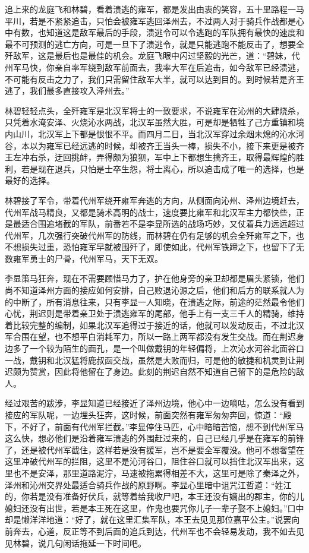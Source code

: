 追上来的龙庭飞和林碧，看着溃逃的雍军，都是发出由衷的笑容，五十里路程一马平川，若是不紧紧追击，只怕会被雍军逃回泽州去，不过两人对于骑兵作战都是心中有数，也知道这是敌军最后的手段，溃逃令可以令逃跑的军队拥有最快的速度和最不可预测的逃亡方向，可是一旦下了溃逃令，就是只能逃跑不能反击了，想要全歼敌军，这是最后也是最佳的机会。龙庭飞眼中闪过坚毅的光芒，道：“碧妹，代州军马快，你亲自率军绕到敌军前面去，我率大军在后追击，如今敌军已经溃逃，不可能有反击之力了，我们只需留住敌军大半，就可以达到目的。到时候若是齐王逃了，我们最多直接攻入泽州去。”

林碧轻轻点头，全歼雍军是北汉军将士的一致要求，不说雍军在沁州的大肆烧杀，只凭着水淹安泽、火烧沁水两战，北汉军虽然大胜，可是却是牺牲了己方重镇和境内山川，北汉军上下都是恨恨不平。而四月二日，当北汉军穿过余烟未熄的沁水河谷，本以为雍军已经远逃的时候，却被齐王当头一棒，损失不小，接下来更是被齐王左冲右杀，迂回挑衅，弄得颇为狼狈，军中上下都想生擒齐王，取得最辉煌的胜利，若是现在退兵，只怕是士卒生怨，将士离心，所以追击成了唯一的选择，也是最好的选择。

林碧接了军令，带着代州军绕开雍军奔逃的方向，从侧面向沁州、泽州边境赶去，代州军战马精良，又都是骑术高明的战士，速度要比雍军和北汉军主力都快些，正是最适合围追堵截的军队，前番若不是李显所选的战场巧妙，又仗着兵力远远超过代州军，几次强行突破代州军的防线，而林碧在仍有足够的机会全歼雍军之下，也不想损失过重，恐怕雍军早就被围歼了，即使如此，代州军铁蹄之下，也留下了无数雍军勇士的尸骨，代州军马，天下无双。

李显策马狂奔，现在不需要顾惜马力了，护在他身旁的亲卫却都是眉头紧锁，他们尚不知道泽州方面的接应如何安排，自己败退沁源之后，他们和后方的联系就人为的中断了，所有消息往来，只有李显一人知晓，在溃逃之际，前途的茫然最令他们心忧，荆迟则是带着亲卫处于溃逃雍军的尾部，他手上有一支三千人的精骑，维持着比较完整的编制，如果北汉军追得过于接近的话，他就可以发动反击，不过北汉军合围在望，也不想平白消耗军力，所以一路上两军都没有发生交战。而在荆迟身边多了一个较为陌生的面孔，是一个叫做戴钥的年轻偏将，上次沁水河谷北面谷口一战，戴钥和北汉猛将鹿叔函交战，虽然是大败而归，可是他的敏捷和机灵到让荆迟颇为赞赏，因此将他留在了身边。此刻的荆迟自然不知道自己留下的是危险的敌人。

经过艰苦的跋涉，李显知道已经接近了泽州边境，他心中一边嘀咕，怎么没有看到接应的军队呢，一边埋头狂奔，这时候，前面突然有雍军匆匆奔回，惊道：“殿下，不好了，前面有代州军拦截。”李显停住马匹，心中暗暗苦恼，想不到代州军马这么快，想必他们是沿着雍军溃逃的外围赶过来的，自己已经几乎是在雍军的前锋了，还是被代州军截住，这样若是没有援军，岂不是要全军覆没。他可不想奢望在这里冲破代州军的拦阻，这里不是沁河谷口，阻住谷口就可以挡住北汉军出来，这里也不是安泽，那里道路泥泞，马速被拖累得相差不大，这里可是除了秦泽之外，泽州和沁州交界处最适合骑兵作战的原野啊。李显心里暗中诅咒江哲道：“姓江的，你若是没有准备好伏兵，就等着给我收尸吧，本王还没有嫡出的郡主，你的儿媳妇还没有出世，若是本王死在这里，作鬼也要咒你儿子一辈子娶不上媳妇。”口中却是懒洋洋地道：“好了，就在这里汇集军队，本王去见见那位嘉平公主。”说罢向前奔去，心道，反正等不到后面的追兵到达，代州军也不会轻易发动，我不如去见见林碧，说几句闲话拖延一下时间吧。

